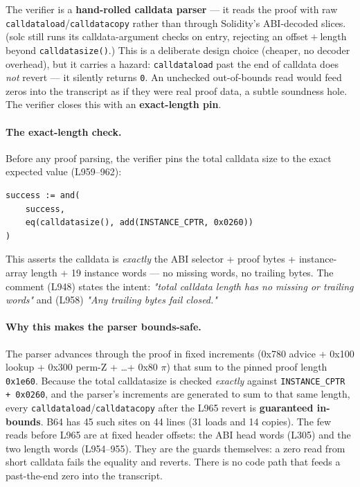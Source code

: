 The verifier is a \textbf{hand-rolled calldata parser} --- it reads
the proof with raw \texttt{calldataload}/\texttt{calldatacopy}
rather than through Solidity's ABI-decoded slices. (solc still runs its
calldata-argument checks on entry, rejecting an offset${}+{}$length
beyond \texttt{calldatasize()}.) This is a deliberate design
choice (cheaper, no decoder overhead), but it carries a hazard:
\texttt{calldataload} past the end of calldata does \emph{not}
revert --- it silently returns \texttt{0}. An unchecked
out-of-bounds read would feed zeros into the transcript as if they
were real proof data, a subtle soundness hole. The verifier closes
this with an \textbf{exact-length pin}.

\paragraph{The exact-length check.} Before any proof parsing, the
verifier pins the total calldata size to the exact expected value
(L959--962):
\begin{lstlisting}[style=yul]
success := and(
    success,
    eq(calldatasize(), add(INSTANCE_CPTR, 0x0260))
)
\end{lstlisting}
This asserts the calldata is \emph{exactly} the ABI selector +
proof bytes + instance-array length + 19 instance words --- no
missing words, no trailing bytes. The comment (L948) states the
intent: \emph{"total calldata length has no missing or trailing
words"} and (L958) \emph{"Any trailing bytes fail closed."}

\paragraph{Why this makes the parser bounds-safe.} The parser
advances through the proof in fixed increments (0x780 advice +
0x100 lookup + 0x300 perm-Z + \ldots + 0x80 $\pi$) that sum to
the pinned proof length \texttt{0x1e60}. Because the total
calldatasize is checked \emph{exactly} against
\texttt{INSTANCE\_\allowbreak{}CPTR + 0x0260}, and the parser's increments are
generated to sum to that same length, every
\texttt{calldataload}/\texttt{calldatacopy} after the L965 revert is
\textbf{guaranteed in-bounds}. B64 has 45 such sites on 44 lines
(31 loads and 14 copies). The few reads before L965 are at fixed
header offsets: the ABI head words (L305) and the two length words
(L954--955). They are the guards themselves: a zero read from short
calldata fails the equality and reverts. There is no code path that
feeds a past-the-end zero into the transcript.

